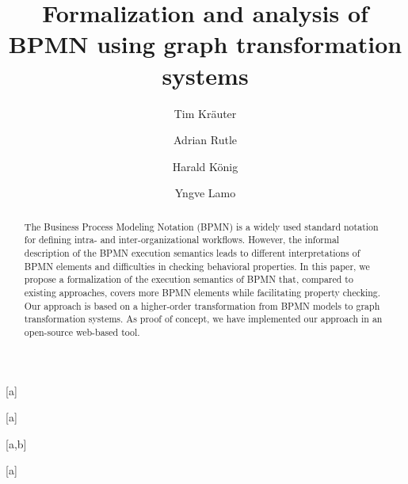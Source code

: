 \documentclass{lmcs} %
\theoremstyle{plain}\newtheorem{satz}[thm]{Satz} %
\begin{document}
\title[Formalization and analysis of BPMN using graph transformation systems]{Formalization and analysis of BPMN using graph transformation systems\rsuper*}

\author[T.~Kr\"{a}uter]{Tim Kr\"{a}uter}[a]
\author[A.~Rutle]{Adrian Rutle}[a]
\author[H.~K\"{o}nig]{Harald K\"{o}nig}[a,b]
\author[Y.~Lamo]{Yngve Lamo}[a]

\address{Western Norway University of Applied Sciences, Bergen, Norway}

\address{University of Applied Sciences, FHDW, Hanover, Germany}





\begin{abstract}
  \noindent
The Business Process Modeling Notation (BPMN) is a widely used standard notation for defining intra- and inter-organizational workflows.
However, the informal description of the BPMN execution semantics leads to different interpretations of BPMN elements and difficulties in checking behavioral properties.
In this paper, we propose a formalization of the execution semantics of BPMN that, compared to existing approaches, covers more BPMN elements while facilitating property checking.
Our approach is based on a higher-order transformation from BPMN models to graph transformation systems.
As proof of concept, we have implemented our approach in an open-source web-based tool.
\end{abstract}
\end{document}
